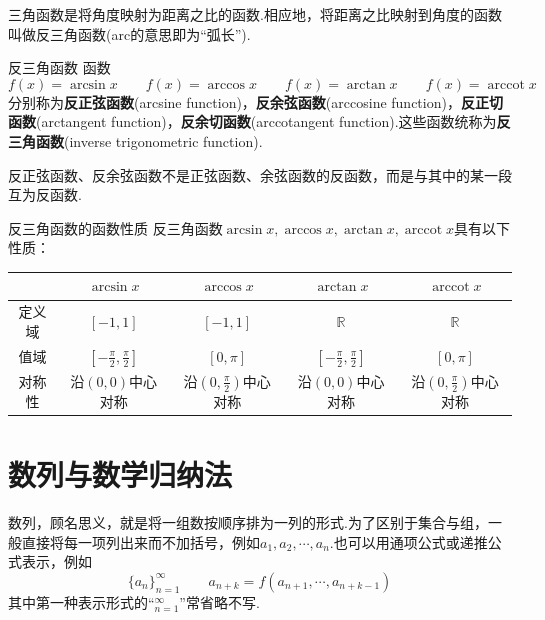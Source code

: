 \documentclass[lang=cn, zihao=5]{elegantbook}
\DeclareMathOperator{\arccot}{arccot}
\begin{document}
三角函数是将角度映射为距离之比的函数.相应地，将距离之比映射到角度的函数叫做反三角函数(arc的意思即为“弧长”).

\begin{definition}{反三角函数}
    函数$$f(x)=\arcsin{x} \qquad f(x)=\arccos{x} \qquad f(x)=\arctan{x} \qquad f(x)=\arccot{x}$$
    分别称为\textbf{反正弦函数}(arcsine function)，\textbf{反余弦函数}(arccosine function)，\textbf{反正切函数}(arctangent function)，\textbf{反余切函数}(arccotangent function).这些函数统称为\textbf{反三角函数}(inverse trigonometric function).
\end{definition}
\begin{note}
    反正弦函数、反余弦函数不是正弦函数、余弦函数的反函数，而是与其中的某一段互为反函数.
\end{note}

\begin{proposition}{反三角函数的函数性质}
    反三角函数$\arcsin{x},\arccos{x},\arctan{x},\arccot{x}$具有以下性质：

    \vspace{1em}
    \centering
    \renewcommand\arraystretch{1.2}
    \begin{tabular}{c|c|c|c|c}
        \hline
          & $\arcsin{x}$ & $\arccos{x}$ & $\arctan{x}$ & $\arccot{x}$ \\ \hline
        定义域 & $[-1,1]$ & $[-1,1]$ & $\mathbb{R}$ & $\mathbb{R}$ \\ \hline
        值域 & $[-\frac{\pi}{2} ,\frac{\pi}{2}]$ & $[0,\pi]$ & $[-\frac{\pi}{2},\frac{\pi}{2}]$ & $[0,\pi]$ \\ \hline
        对称性 & 沿$(0,0)$中心对称 & 沿$(0,\frac{\pi}{2})$中心对称 & 沿$(0,0)$中心对称 & 沿$(0,\frac{\pi}{2})$中心对称 \\ \hline
    \end{tabular}
    
\end{proposition}


\chapter{数列与数学归纳法}

数列，顾名思义，就是将一组数按顺序排为一列的形式.为了区别于集合与组，一般直接将每一项列出来而不加括号，例如$a_1,a_2, \cdots ,a_n$.也可以用通项公式或递推公式表示，例如
$$\{ a_n \}_{n=1}^{\infty} \qquad a_{n+k}=f(a_{n+1}, \cdots ,a_{n+k-1})$$
其中第一种表示形式的“$_{n=1}^{\infty}$”常省略不写.
\end{document}
